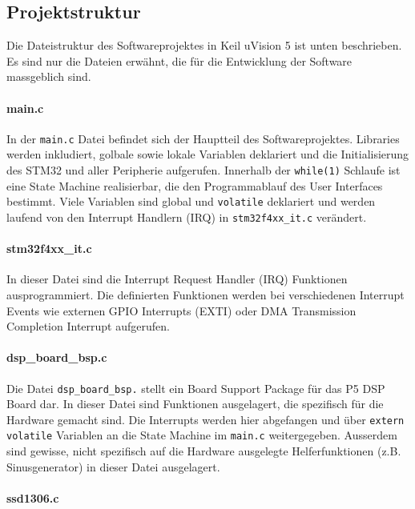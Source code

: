 \subsection{Projektstruktur}
\label{sec:SWProjekt}

Die Dateistruktur des Softwareprojektes in Keil uVision 5 ist unten beschrieben. 
Es sind nur die Dateien erwähnt, die für die Entwicklung der Software massgeblich sind.

\paragraph{main.c}

In der \texttt{main.c} Datei befindet sich der Hauptteil des Softwareprojektes.
Libraries werden inkludiert, golbale sowie lokale Variablen deklariert und die Initialisierung des STM32 und aller Peripherie aufgerufen.
Innerhalb der \texttt{while(1)} Schlaufe ist eine State Machine realisierbar, die den Programmablauf des User Interfaces bestimmt.
Viele Variablen sind global und \texttt{volatile} deklariert und werden laufend von den Interrupt Handlern (IRQ) in \texttt{stm32f4xx\_it.c} verändert.

\paragraph{stm32f4xx\_it.c}

In dieser Datei sind die Interrupt Request Handler (IRQ) Funktionen ausprogrammiert.
Die definierten Funktionen werden bei verschiedenen Interrupt Events wie externen GPIO Interrupts (EXTI) oder DMA Transmission Completion Interrupt aufgerufen.

\paragraph{dsp\_board\_bsp.c}

Die Datei \texttt{dsp\_board\_bsp.} stellt ein Board Support Package für das P5 DSP Board dar.
In dieser Datei sind Funktionen ausgelagert, die spezifisch für die Hardware gemacht sind.
Die Interrupts werden hier abgefangen und über \texttt{extern volatile} Variablen an die State Machine im \texttt{main.c} weitergegeben.
Ausserdem sind gewisse, nicht spezifisch auf die Hardware ausgelegte Helferfunktionen (z.B. Sinusgenerator) in dieser Datei ausgelagert.

\paragraph{ssd1306.c}

